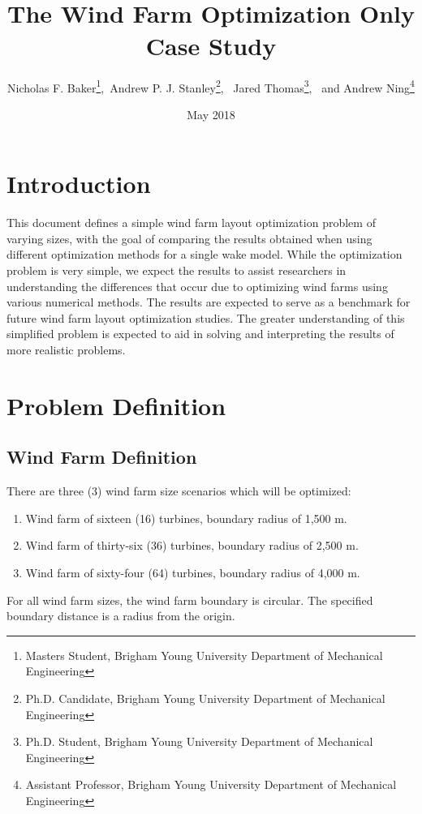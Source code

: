 \documentclass[12pt]{article}
\begin{document}
\title{ \\
The Wind Farm Optimization Only Case Study}
\author{Nicholas F. Baker\thanks{Masters Student, Brigham Young University Department of Mechanical Engineering},\  Andrew P. J. Stanley\thanks{Ph.D. Candidate, Brigham Young University Department of Mechanical Engineering}, \ Jared Thomas\thanks{Ph.D. Student, Brigham Young University Department of Mechanical Engineering}, \ and Andrew Ning\thanks{Assistant Professor, Brigham Young University Department of Mechanical Engineering}}
\date{May 2018}

\maketitle{}

\section{Introduction}
   This document defines a simple wind farm layout optimization problem of varying sizes, with the goal of comparing the results obtained when using different optimization methods for a single wake model. While the optimization problem is very simple, we expect the results to assist researchers in understanding the differences that occur due to optimizing wind farms using various numerical methods. The results are expected to serve as a benchmark for future wind farm layout optimization studies. The greater understanding of this simplified problem is expected to aid in solving and interpreting the results of more realistic problems.

\section{Problem Definition}
\subsection{Wind Farm Definition}
There are three (3) wind farm size scenarios which will be optimized:
    \begin{enumerate}
        \item Wind farm of sixteen (16) turbines, boundary radius of 1,500 m.
        \item Wind farm of thirty-six (36) turbines, boundary radius of 2,500 m.
        \item Wind farm of sixty-four (64) turbines, boundary radius of 4,000 m.
    \end{enumerate}
For all wind farm sizes, the wind farm boundary is circular. The specified boundary distance is a radius from the origin.
\end{document}
